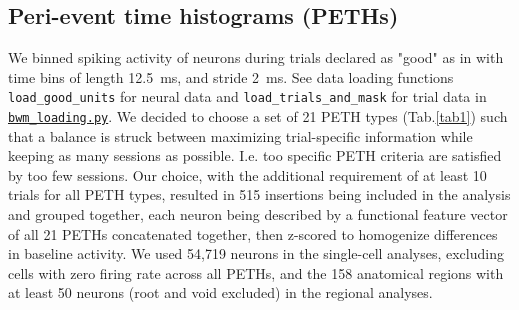 \documentclass[10pt,lineno]{elife}
\begin{document}
\subsection{Peri-event time histograms (PETHs)}
We binned spiking activity of neurons during trials declared as "good" as in\cite{international2025brain} with
time bins of length 12.5~ms, and stride 2~ms. See data loading functions \texttt{load\_good\_units} for neural data and \texttt{load\_trials\_and\_mask} for trial data in \href{https://github.com/int-brain-lab/paper-brain-wide-map/blob/main/brain-widemap/bwm_loading.py}{\texttt{bwm\_loading.py}}. We decided to choose a set of 21 PETH types (Tab.\ref{tab1}) such that a balance is struck between maximizing trial-specific information while keeping as many sessions as possible. I.e. too specific PETH criteria are satisfied by too few sessions. Our choice, with the additional requirement of at least 10 trials for all PETH types, resulted in 515 insertions being included in the analysis and grouped together, each neuron being described by a functional feature vector of all 21 PETHs concatenated together, then z-scored to homogenize differences in baseline activity. We used 54,719 neurons in the single-cell analyses, excluding cells with zero firing rate across all PETHs, and the 158 anatomical regions with at least 50 neurons (root and void excluded) in the regional analyses. 
\end{document}
